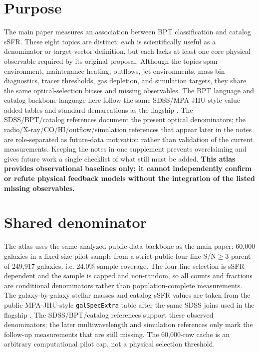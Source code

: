 \documentclass[twocolumn]{aastex631}
\begin{document}
\section{Purpose}
The main paper measures an association between BPT classification and catalog sSFR. These eight topics are distinct: each is scientifically useful as a denominator or target-vector definition, but each lacks at least one core physical observable required by its original proposal. Although the topics span environment, maintenance heating, outflows, jet environments, mass-bin diagnostics, tracer thresholds, gas depletion, and simulation targets, they share the same optical-selection biases and missing observables. The BPT language and catalog-backbone language here follow the same SDSS/MPA-JHU-style value-added tables and standard demarcations as the flagship \citep{sdssdr17,brinchmann2004,york2000,baldwin1981,kewley2001,kauffmann2003bpt,kewley2006,stasinska2008,stasinska2015}. The SDSS/BPT/catalog references document the present optical denominators; the radio/X-ray/CO/HI/outflow/simulation references that appear later in the notes are role-separated as future-data motivation rather than validation of the current measurements. Keeping the notes in one supplement prevents overclaiming and gives future work a single checklist of what still must be added. \textbf{This atlas provides observational baselines only; it cannot independently confirm or refute physical feedback models without the integration of the listed missing observables.}

\section{Shared denominator}
The atlas uses the same analyzed public-data backbone as the main paper: 60,000 galaxies in a fixed-size pilot sample from a strict public four-line S/N$\geq3$ parent of 249,917 galaxies, i.e. 24.0\% sample coverage. The four-line selection is sSFR-dependent and the sample is capped and non-random, so all counts and fractions are conditional denominators rather than population-complete measurements. The galaxy-by-galaxy stellar masses and catalog sSFR values are taken from the public MPA-JHU-style \texttt{galSpecExtra} table after the same SDSS joins used in the flagship \citep{sdssdr17,brinchmann2004,york2000}. The SDSS/BPT/catalog references support these observed denominators; the later multiwavelength and simulation references only mark the follow-up measurements that are still missing. The 60,000-row cache is an arbitrary computational pilot cap, not a physical selection threshold.
\end{document}
